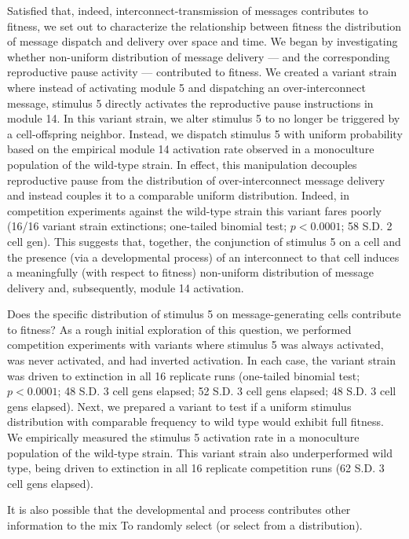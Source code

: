 Satisfied that, indeed, interconnect-transmission of messages contributes to fitness, we set out to characterize the relationship between fitness the distribution of message dispatch and delivery over space and time.
We began by investigating whether non-uniform distribution of message delivery --- and the corresponding reproductive pause activity --- contributed to fitness.
We created a variant strain where instead of activating module 5 and dispatching an over-interconnect message, stimulus 5 directly activates the reproductive pause instructions in module 14.
In this variant strain, we alter stimulus 5 to no longer be triggered by a cell-offspring neighbor.
Instead, we dispatch stimulus 5 with uniform probability based on the empirical module 14 activation rate observed in a monoculture population of the wild-type strain.
In effect, this manipulation decouples reproductive pause from the distribution of over-interconnect message delivery and instead couples it to a comparable uniform distribution.
Indeed, in competition experiments against the wild-type strain this variant fares poorly (16/16 variant strain extinctions; one-tailed binomial test; $p < 0.0001$; 58 S.D. 2 cell gen).
This suggests that, together, the conjunction of stimulus 5 on a cell and the presence (via a developmental process) of an interconnect to that cell induces a meaningfully (with respect to fitness) non-uniform distribution of message delivery and, subsequently, module 14 activation.

Does the specific distribution of stimulus 5 on message-generating cells contribute to fitness?
As a rough initial exploration of this question, we performed competition experiments with variants where stimulus 5 was always activated, was never activated, and had inverted activation.
In each case, the variant strain was driven to extinction in all 16 replicate runs (one-tailed binomial test; $p < 0.0001$; 48 S.D. 3 cell gens elapsed; 52 S.D. 3 cell gens elapsed; 48 S.D. 3 cell gens elapsed).
Next, we prepared a variant to test if a uniform stimulus distribution with comparable frequency to wild type would exhibit full fitness.
We empirically measured the stimulus 5 activation rate in a monoculture population of the wild-type strain.
This variant strain also underperformed wild type, being driven to extinction in all 16 replicate competition runs (62 S.D. 3 cell gens elapsed).

It is also possible that the developmental and  process contributes other information to the mix
To randomly select (or select from a distribution).


